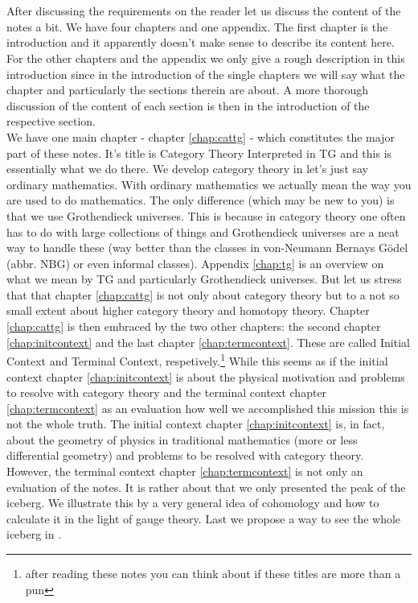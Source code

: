 \\\\
After discussing the requirements on the reader let us discuss the content of the notes a bit. We have four chapters and one appendix. The first chapter is the introduction and it apparently doesn't make sense to describe its content here. For the other chapters and the appendix we only give a rough description in this introduction since in the introduction of the single chapters we will say what the chapter and particularly the sections therein are about. A more thorough discussion of the content of each section is then in the introduction of the respective section.
\\
We have one main chapter - chapter \ref{chap:cattg} - which constitutes the major part of these notes. It's title is {\glqq}Category Theory Interpreted in TG{\grqq} and this is essentially what we do there. We develop category theory in let's just say ordinary mathematics. With ordinary mathematics we actually mean the way you are used to do mathematics. The only difference (which may be new to you) is that we use {\glqq}Grothendieck universes{\grqq}. This is because in category theory one often has to do with large collections of things and Grothendieck universes are a neat way to handle these (way better than the classes in von-Neumann Bernays G\"{o}del (abbr. NBG) or even informal classes). Appendix \ref{chap:tg} is an overview on what we mean by TG and particularly Grothendieck universes. But let us stress that that chapter \ref{chap:cattg} is not only about category theory but to a not so small extent about higher category theory and homotopy theory. Chapter \ref{chap:cattg} is then embraced by the two other chapters: the second chapter \ref{chap:initcontext} and the last chapter \ref{chap:termcontext}. These are called {\glqq}Initial Context{\grqq} and {\glqq}Terminal Context{\grqq}, respetively.\footnote{after reading these notes you can think about if these titles are more than a pun} While this seems as if the initial context chapter \ref{chap:initcontext} is about the physical motivation and problems to resolve with category theory and the terminal context chapter \ref{chap:termcontext} as an evaluation how well we accomplished this mission this is not the whole truth. The initial context chapter \ref{chap:initcontext} is, in fact, about the geometry of physics in traditional mathematics (more or less differential geometry) and problems to be resolved with category theory. However, the terminal context chapter \ref{chap:termcontext} is not only an evaluation of the notes. It is rather about that we only presented the peak of the iceberg. We illustrate this by a very general idea of cohomology and how to calculate it in the light of gauge theory. Last we propose a way to see the whole {\glqq}iceberg{\grqq} in \cite{a565d200}.
